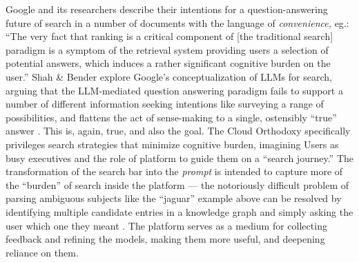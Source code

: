 Google and its researchers describe their intentions for a
question-answering future of search in a number of documents \cite{googleWhyWeFocus2023, adolphsBoostingSearchEngines2022, metzlerRethinkingSearchMaking2021, nayakMUMNewAI2021, bronsteinBringingYouNextgeneration2019, gomesImprovingSearchNext2018, pichaiPersonalGoogleJust2016}  with the language of
\emph{convenience,} eg.: ``The very fact that ranking is a critical
component of {[}the traditional search{]} paradigm is a symptom of the
retrieval system providing users a selection of potential answers, which
induces a rather significant cognitive burden on the user.'' Shah \&
Bender explore Google's conceptualization of LLMs for search, arguing
that the LLM-mediated question answering paradigm fails to support a
number of different information seeking intentions like surveying a
range of possibilities, and flattens the act of sense-making to a
single, ostensibly ``true'' answer \cite{shahSituatingSearch2022} . This is, again, true, and also the goal. The Cloud Orthodoxy
specifically privileges search strategies that minimize cognitive
burden, imagining Users as busy executives and the role of platform to
guide them on a ``search journey.'' The transformation of the search bar
into the \emph{prompt} is intended to capture more of the ``burden'' of
search inside the platform --- the notoriously difficult problem of
parsing ambiguous subjects like the ``jaguar'' example above can be
resolved by identifying multiple candidate entries in a knowledge graph
and simply asking the user which one they meant \cite{bharadwajDependencyGraphGeneration2020} . The platform serves as a
medium for collecting feedback and refining the models, making them more
useful, and deepening reliance on them.

